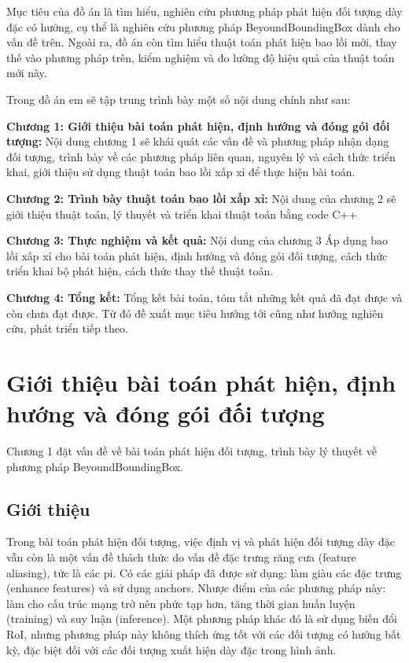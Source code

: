 \documentclass[12pt,a4paper,openany,oneside]{report}
\begin{document}
Mục tiêu của đồ án là tìm hiểu, nghiên cứu phương pháp phát hiện đối tượng dày đặc có hướng, cụ thể là nghiên cứu phương pháp BeyoundBoundingBox dành cho vấn đề trên. Ngoài ra, đồ án còn tìm hiểu thuật toán phát hiện bao lồi mới, thay thế vào phương pháp trên, kiểm nghiệm và đo lường độ hiệu quả của thuật toán mới này.


Trong đồ án em sẽ tập trung trình bày một số nội dung chính như sau:

\textbf{Chương 1: Giới thiệu bài toán phát hiện, định hướng và đóng gói đối tượng:}
Nội dung chương 1 sẽ khái quát các vấn đề và phương pháp nhận dạng đối tượng, trình bày về các phương pháp liên quan, nguyên lý và cách thức triển khai, giới thiệu sử dụng thuật toán bao lồi xấp xỉ để thực hiện bài toán.


\textbf{Chương 2: Trình bày thuật toán bao lồi xấp xỉ:}
Nội dung của chương 2 sẽ giới thiệu thuật toán, lý thuyết và triển khai thuật toán bằng code C++


\textbf{Chương 3: Thực nghiệm và kết quả:}
Nội dung của chương 3 Áp dụng bao lồi xấp xỉ cho bài toán phát hiện, định hướng và đóng gói đối tượng, cách thức triển khai bộ phát hiện, cách thức thay thế thuật toán.


\textbf{Chương 4: Tổng kết:}
Tổng kết bài toán, tóm tắt những kết quả đã đạt được và còn chưa đạt được. Từ đó đề xuất mục tiêu hướng tới cũng như hướng nghiên cứu, phát triển tiếp theo.



 


\chapter{Giới thiệu bài toán phát hiện, định hướng và đóng gói đối tượng}

Chương 1 đặt vấn đề về bài toán phát hiện đối tượng, trình bày lý thuyết về phương pháp BeyoundBoundingBox.



\section{Giới thiệu}
Trong bài toán phát hiện đối tượng, việc định vị và phát hiện đối tượng dày đặc vẫn còn là một vấn đề thách thức do vấn đề đặc trưng răng cưa (feature aliasing), tức là các pi. Có các giải pháp đã được sử dụng: làm giàu các đặc trưng (enhance features) và sử dụng anchors. Nhược điểm của các phương pháp này: làm cho cấu trúc mạng trở nên phức tạp hơn, tăng thời gian huấn luyện (training) và suy luận (inference). Một phương pháp khác đó là sử dụng biến đổi RoI, nhưng phương pháp này không thích ứng tốt với các đối tượng có hướng bất kỳ, đặc biệt đối với các đối tượng xuất hiện dày đặc trong hình ảnh.
\end{document}
